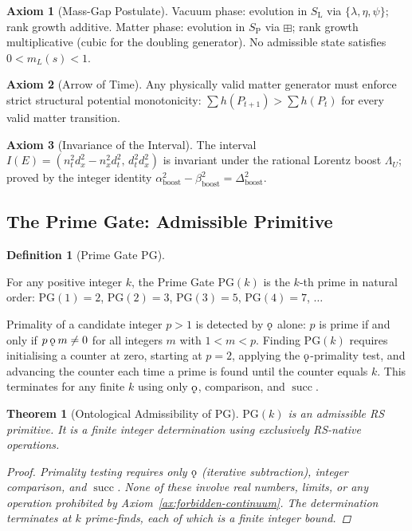 \documentclass[11pt, letterpaper]{article}
\newcommand{\SL}{S_{\mathrm{L}}}
\newcommand{\SP}{S_{\mathrm{P}}}
\newcommand{\lop}{\lambda}
\newcommand{\aop}{\eta}
\newcommand{\bplus}{\boxplus}
\renewcommand{\succ}{\operatorname{succ}}
\newcommand{\hfn}{h}
\newcommand{\koppa}{\mathbin{\text{\rm\k{o}}}}
\newcommand{\PG}{\mathrm{PG}}
\theoremstyle{definition}
\newtheorem{definition}{Definition}[section]
\newtheorem{axiom}{Axiom}[section]
\theoremstyle{plain}
\newtheorem{theorem}{Theorem}[section]
\begin{document}
\begin{axiom}[Mass-Gap Postulate]\label{ax:mass-gap}
Vacuum phase: evolution in $\SL$ via $\{\lop,\aop,\psi\}$; rank growth
additive.  Matter phase: evolution in $\SP$ via $\bplus$; rank growth
multiplicative (cubic for the doubling generator).  No admissible state
satisfies $0<m_L(s)<1$.
\end{axiom}

\begin{axiom}[Arrow of Time]\label{ax:arrow}
Any physically valid matter generator must enforce strict structural potential
monotonicity: $\sum\hfn(P_{t+1})>\sum\hfn(P_t)$ for every valid matter
transition.
\end{axiom}

\begin{axiom}[Invariance of the Interval]\label{ax:interval}
The interval $I(E)=(n_t^2 d_x^2-n_x^2 d_t^2,\,d_t^2 d_x^2)$ is invariant
under the rational Lorentz boost $\Lambda_U$; proved by the integer identity
$\alpha_{\mathrm{boost}}^2-\beta_{\mathrm{boost}}^2=\Delta_{\mathrm{boost}}^2$.
\end{axiom}

\subsection{The Prime Gate: Admissible Primitive}\label{sec:primegate}

\begin{definition}[Prime Gate $\PG$]\label{def:primegate}
\begin{rsbox}
For any positive integer $k$, the Prime Gate $\PG(k)$ is the $k$-th
prime in natural order: $\PG(1)=2$, $\PG(2)=3$, $\PG(3)=5$, $\PG(4)=7$,
$\ldots$

Primality of a candidate integer $p>1$ is detected by $\koppa$ alone: $p$ is
prime if and only if $p\koppa m\neq 0$ for all integers $m$ with $1<m<p$.
Finding $\PG(k)$ requires initialising a counter at zero, starting at $p=2$,
applying the $\koppa$-primality test, and advancing the counter each time a
prime is found until the counter equals $k$.  This terminates for any finite
$k$ using only $\koppa$, comparison, and $\succ$.
\end{rsbox}
\end{definition}

\begin{theorem}[Ontological Admissibility of $\PG$]\label{thm:pg-admissible}
$\PG(k)$ is an admissible RS primitive.  It is a finite integer determination
using exclusively RS-native operations.
\begin{proof}
Primality testing requires only $\koppa$ (iterative subtraction), integer
comparison, and $\succ$.  None of these involve real numbers, limits, or any
operation prohibited by Axiom~\ref{ax:forbidden-continuum}.  The determination
terminates at $k$ prime-finds, each of which is a finite integer bound.
\end{proof}
\end{theorem}
\end{document}
